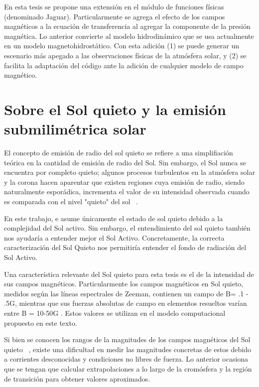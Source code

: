 En esta tesis se propone una extensi\'on en el m\'odulo de funciones f\'isicas (denominado Jaguar). Particularmente se agrega el efecto de los campos magn\'eticos a la ecuaci\'on de transferencia al agregar la componente de la presi\'on magn\'etica. Lo anterior convierte al modelo hidrodin\'amico que se usa actualmente en un modelo magnetohidrost\'atico. Con esta adici\'on (1) se puede generar un escenario m\'as apegado a las observaciones f\'isicas de la atm\'osfera solar, y (2) se facilita la adaptaci\'on del c\'odigo ante la adici\'on de cualquier modelo de campo magn\'etico.



\section{Sobre el Sol quieto y la emisi\'on submilim\'etrica solar}

El concepto de emisión de radio del sol quieto se refiere a una simplifiación teórica en la cantidad de emisión de radio del Sol. Sin embargo, el Sol nunca se encuentra por completo quieto; algunos procesos turbulentos en la atm\'osfera solar y la corona hacen aparentar que existen regiones cuya emisi\'on de radio, siendo naturalmente espor\'adica, incrementa el valor de su intensidad observada cuando es comparada con el nivel "quieto" del sol ~\citep{sol_quieto}.

En este trabajo, e asume \'unicamente el estado de sol quieto debido a la complejidad del Sol activo. Sin embargo, el entendimiento del sol quieto tambi\'en nos ayudar\'ia a entender mejor el Sol Activo. Concretamente, la correcta caracterizaci\'on del Sol Quieto nos permitir\'ia entender el fondo de radiaci\'on del Sol Activo.

Una caracter\'istica relevante del Sol quieto para esta tesis es el de la intensidad de sus campos magn\'eticos. Particularmente los campos magn\'eticos en Sol quieto, medidos seg\'un las l\'ineas espectrales de Zeeman, contienen un campo de B= .1 - .5G, mientras que sus fuerzas absolutas de campo en elementos resueltos var\'ian entre B = 10-50G \citep{1000G}. Estos valores se utilizan en el modelo computacional propuesto en este texto.

Si bien se conocen los rangos de la magnitudes de los campos magn\'eticos del Sol quieto ~\citep{VAULT2}, existe una dificultad en medir las magnitudes concretas de estos debido a corrientes desconocidas y condiciones no libres de fuerza. Lo anterior ocasiona que se tengan que calcular extrapolaciones a lo largo de la crom\'osfera y la regi\'on de transici\'on para obtener valores aproximados. 

